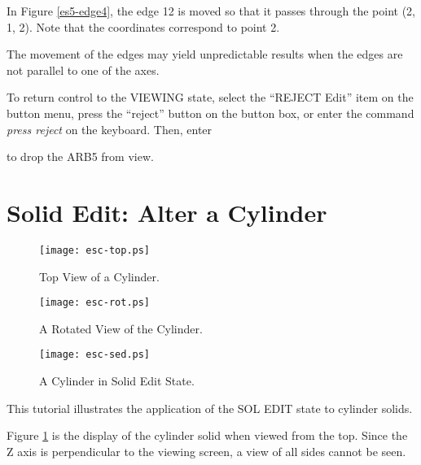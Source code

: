 In Figure \ref{es5-edge4},
the edge 12 is moved so that it passes through the point (2, 1, 2).
Note that the coordinates correspond to point 2.

The movement of the edges may yield unpredictable results when the edges
are not parallel to one of the axes.


To return control to the VIEWING state, select the ``REJECT Edit''
item on the button menu, press the ``reject'' button on the button box,
or enter the command {\em press reject} on the keyboard.
Then, enter


to drop the ARB5 from view.

\section{Solid Edit: Alter a Cylinder}

\begin{figure}
\centering \texttt{[image: esc-top.ps]}
\caption{Top View of a Cylinder.}
\label{esc-top}
\end{figure}

\begin{figure}
\centering \texttt{[image: esc-rot.ps]}
\caption{A Rotated View of the Cylinder.}
\label{esc-rot}
\end{figure}

\begin{figure}
\centering \texttt{[image: esc-sed.ps]}
\caption{A Cylinder in Solid Edit State.}
\label{esc-sed}
\end{figure}

This tutorial illustrates the application of the SOL EDIT state to
cylinder solids.


Figure \ref{esc-top} is the display of the cylinder solid
when viewed from the top.
Since the
Z axis is perpendicular to the viewing screen, a view of all sides cannot be
seen.


